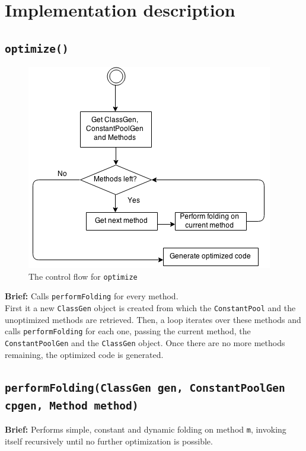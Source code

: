 \section{Implementation description}
\label{sec:description}

\subsection{\texttt{optimize()}}
\begin{figure}[h!]
\centering
\includegraphics[scale=0.6]{figures/overview}
\caption{The control flow for \texttt{optimize}}
\label{fig:overview}
\end{figure}
\textbf{Brief: }Calls \texttt{performFolding} for every method.\\

First it a new \texttt{ClassGen} object is created from which the \texttt{ConstantPool} and the unoptimized methods are retrieved. Then,  a loop iterates over these methods and calls \texttt{performFolding} for each one,  passing the current method, the \texttt{ConstantPoolGen} and the \texttt{ClassGen} object. Once there are no more methods remaining, the optimized code is generated.

\subsection{\texttt{performFolding(ClassGen gen, ConstantPoolGen cpgen, Method method)}}
\label{subsec:performfolding}
\textbf{Brief: }Performs simple, constant and dynamic folding on method \texttt{m}, invoking itself recursively until no further optimization is possible. \\

